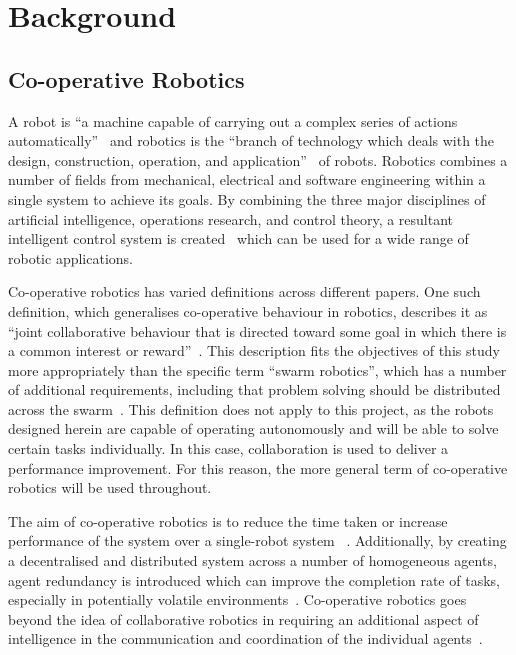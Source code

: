 
\chapter{Background}\label{litreview}

\section{Co-operative Robotics}\label{litreview/robotics}
A robot is ``a machine capable of carrying out a complex series of actions 
automatically''~\cite{robotdef} and robotics is the ``branch of technology which deals with the design, construction, 
operation, and application''~\cite{roboticsdef} of robots. Robotics combines a number of fields from mechanical, 
electrical and software engineering within a single system to achieve its goals. By 
combining the three major disciplines of artificial intelligence, operations 
research, and control theory, a resultant intelligent control system is created~\cite{saridis1983intelligent} which can be 
used for a wide range of robotic applications.

Co-operative robotics has varied definitions across different papers. One such
definition, which generalises co-operative behaviour in robotics, describes it 
as ``joint collaborative behaviour that is directed toward some goal in which 
there is a common interest or reward''~\cite{barnes1991behaviour}. This 
description fits the objectives of this study more appropriately than the 
specific term ``swarm robotics'',  which has a number of additional requirements, 
including that problem solving should be distributed across the swarm~\cite{sahin04}. This definition does not apply to this project, as the robots 
designed herein are capable of operating autonomously and will be able to solve 
certain tasks individually. In this case, collaboration is used to deliver a 
performance improvement. For this reason, the more general term of co-operative 
robotics will be used throughout. 

The aim of co-operative robotics is to reduce the time taken or 
increase performance  of the system over a single-robot system~
\cite{premvuti1990consideration}. Additionally, by creating a decentralised and 
distributed system across a number of homogeneous agents, agent redundancy is 
introduced which can improve the completion rate of tasks, especially in 
potentially volatile environments~\cite{beckers1994local, parker95}.
Co-operative robotics goes beyond the idea of collaborative robotics in 
requiring an additional aspect of intelligence in the communication and 
coordination of the individual agents~\cite{cao1995cooperative}. 


